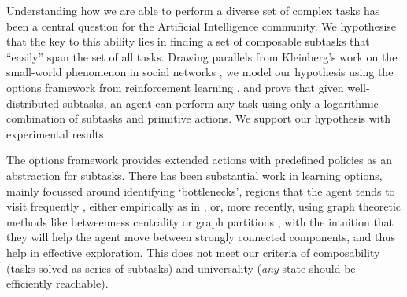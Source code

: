 \label{sec:intro}

Understanding how we are able to perform a diverse set of complex
tasks has been a central question for the Artificial Intelligence
community. We hypothesise that the key to this ability lies in finding
a set of composable subtasks that ``easily'' span the set of all
tasks. Drawing parallels from Kleinberg's work on the small-world
phenomenon in social networks \cite{Kleinberg}, we model our
hypothesis using the options framework from reinforcement learning
\cite{SuttonPrecupSingh1998}, and prove that given well-distributed
subtasks, an agent can perform any task using only a logarithmic
combination of subtasks and primitive actions. We support our
hypothesis with experimental results.

The options framework provides extended actions with predefined
policies as an abstraction for subtasks. There has been substantial
work in learning options, mainly focussed around identifying
`bottlenecks', regions that the agent tends to visit frequently
\cite{McGovern2001}, either empirically as in \cite{McGovern2001}, or,
more recently, using graph theoretic methods like betweenness
centrality \cite{Simsek} or graph partitions \cite{Menache}, with the
intuition that they will help the agent move between strongly
connected components, and thus help in effective exploration. This
does not meet our criteria of composability (tasks solved as series of
subtasks) and universality ({\em any} state should be efficiently
reachable).
